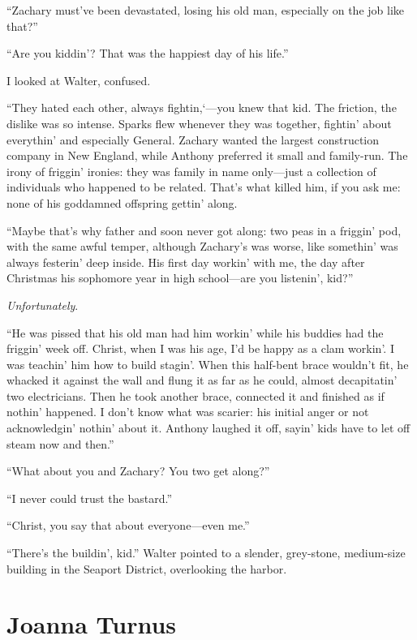 ``Zachary must've been devastated, losing his old man, especially on the
job like that?''

``Are you kiddin'? That was the happiest day of his life.''

I looked at Walter, confused.

``They hated each other, always fightin,`---you knew that kid. The
friction, the dislike was so intense. Sparks flew whenever they was
together, fightin' about everythin' and especially General. Zachary
wanted the largest construction company in New England, while Anthony
preferred it small and family-run. The irony of friggin' ironies: they
was family in name only---just a collection of individuals who happened
to be related. That's what killed him, if you ask me: none of his
goddamned offspring gettin' along.

``Maybe that's why father and soon never got along: two peas in a
friggin' pod, with the same awful temper, although Zachary's was worse,
like somethin' was always festerin' deep inside. His first day workin'
with me, the day after Christmas his sophomore year in high school---are
you listenin', kid?''

\emph{Unfortunately}.

``He was pissed that his old man had him workin' while his buddies had
the friggin' week off. Christ, when I was his age, I'd be happy as a
clam workin'. I was teachin' him how to build stagin'. When this
half-bent brace wouldn't fit, he whacked it against the wall and flung
it as far as he could, almost decapitatin' two electricians. Then he
took another brace, connected it and finished as if nothin' happened. I
don't know what was scarier: his initial anger or not acknowledgin'
nothin' about it. Anthony laughed it off, sayin' kids have to let off
steam now and then.''

``What about you and Zachary? You two get along?''

``I never could trust the bastard.''

``Christ, you say that about everyone---even me.''

``There's the buildin', kid.'' Walter pointed to a slender, grey-stone,
medium-size building in the Seaport District, overlooking the harbor.

\chapter{Joanna Turnus}

\titlemark

